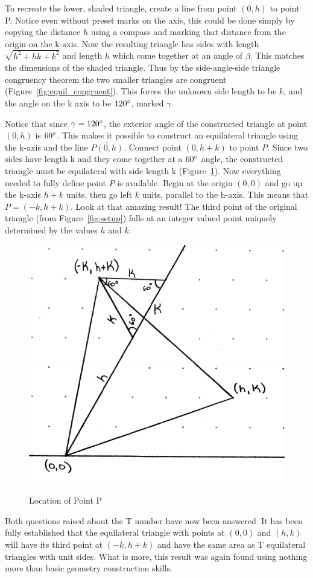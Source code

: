 \documentclass[12pt,letter]{article}
\begin{document}
To recreate the lower, shaded triangle, create a line from point $(0,h)$ to point P. Notice even without preset marks on the axis, this could be done simply by copying the distance $h$ using a compass and marking that distance from the origin on the k-axis. Now the resulting triangle has sides with length $\sqrt{h^2 + hk + k^2}$ and length $h$ which come together at an angle of $\beta$. This matches the dimensions of the shaded triangle. Thus by the side-angle-side triangle congruency theorem the two smaller triangles are congruent (Figure~\ref{fig:equil_congruent}). This forces the unknown side length to be $k$, and the angle on the k axis to be $120\degree$, marked $\gamma$.
	
Notice that since $\gamma=120\degree$, the exterior angle of the constructed triangle at point $(0,h)$ is $60\degree$. This makes it possible to construct an equilateral triangle using the k-axis and the line $\overline{P(0,h)}$. Connect point $(0,h+k)$ to point $P$. Since two sides have length k and they come together at a $60\degree$ angle, the constructed triangle must be equilateral with side length k (Figure~\ref{fig:equil_mini}). Now everything needed to fully define point $P$ is available. Begin at the origin $(0,0)$ and go up the k-axis $h+k$ units, then go left $k$ units, parallel to the h-axis. This means that $P=(-k,h+k)$. Look at that amazing result! The third point of the original triangle (from Figure~\ref{fig:setup}) falls at an integer valued point uniquely determined by the values $h$ and $k$. 

\begin{figure}[h!]
	\centering
	\caption{Location of Point P}
	\includegraphics[width=.45\textwidth]{ddagger_end.pdf}
	\label{fig:equil_mini}
\end{figure}
	
Both questions raised about the T number have now been answered. It has been fully established that the equilateral triangle with points at $(0,0)$ and $(h,k)$ will have its third point at $(-k, h+k)$ and have the same area as T equilateral triangles with unit sides. What is more, this result was again found using nothing more than basic geometry construction skills.
\end{document}
